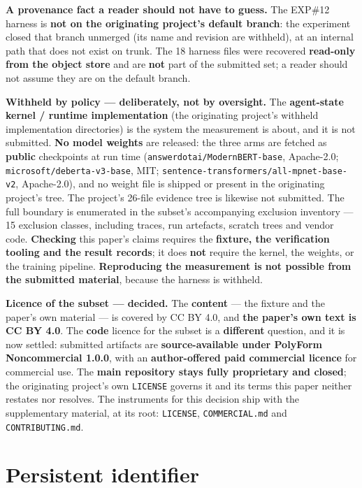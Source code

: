 \documentclass[10pt]{article}
\begin{document}
\textbf{A provenance fact a reader should not have to guess.} The EXP\#12 harness is \textbf{not on the originating project's default branch}: the experiment closed that branch unmerged (its name and revision are withheld), at an internal path that does not exist on trunk. The 18 harness files were recovered \textbf{read-only from the object store} and are \textbf{not} part of the submitted set; a reader should not assume they are on the default branch.

\textbf{Withheld by policy --- deliberately, not by oversight.} The \textbf{agent-state kernel / runtime implementation} (the originating project's withheld implementation directories) is the system the measurement is about, and it is not submitted. \textbf{No model weights} are released: the three arms are fetched as \textbf{public} checkpoints at run time (\texttt{answerdotai/ModernBERT-base}, Apache-2.0; \texttt{microsoft/deberta-v3-base}, MIT; \texttt{sentence-transformers/all-mpnet-base-v2}, Apache-2.0), and no weight file is shipped or present in the originating project's tree. The project's 26-file evidence tree is likewise not submitted. The full boundary is enumerated in the subset's accompanying exclusion inventory --- 15 exclusion classes, including traces, run artefacts, scratch trees and vendor code. \textbf{Checking} this paper's claims requires the \textbf{fixture, the verification tooling and the result records}; it does \textbf{not} require the kernel, the weights, or the training pipeline. \textbf{Reproducing the measurement is not possible from the submitted material}, because the harness is withheld.

\textbf{Licence of the subset --- decided.} The \textbf{content} --- the fixture and the paper's own material --- is covered by CC BY 4.0, and \textbf{the paper's own text is CC BY 4.0}. The \textbf{code} licence for the subset is a \textbf{different} question, and it is now settled: submitted artifacts are \textbf{source-available under PolyForm Noncommercial 1.0.0}, with an \textbf{author-offered paid commercial licence} for commercial use. The \textbf{main repository stays fully proprietary and closed}; the originating project's own \texttt{LICENSE} governs it and its terms this paper neither restates nor resolves. The instruments for this decision ship with the supplementary material, at its root: \texttt{LICENSE}, \texttt{COMMERCIAL.md} and \texttt{CONTRIBUTING.md}.

\section*{Persistent identifier}
\end{document}

